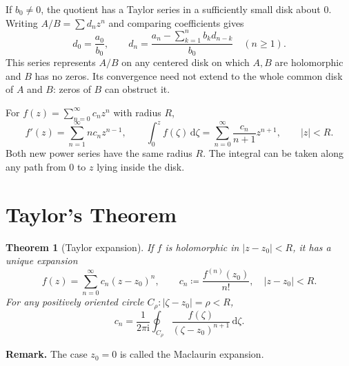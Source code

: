\documentclass[11pt,a4paper]{article}
\theoremstyle{definition}
\theoremstyle{plain}
\newtheorem{theorem}{Theorem}
\newcommand{\dd}{\,\mathrm{d}}
\begin{document}
If $b_0\neq0$, the quotient has a Taylor series in a sufficiently small
disk about $0$. Writing $A/B=\sum d_nz^n$ and comparing coefficients gives
\begin{equation}\label{eq:10}
d_0=\frac{a_0}{b_0},\qquad
 d_n=\frac{a_n-\sum_{k=1}^{n}b_kd_{n-k}}{b_0}\quad(n\geq1).
\end{equation}
This series represents $A/B$ on any centered disk on which $A,B$ are
holomorphic and $B$ has no zeros. Its convergence need not extend to the
whole common disk of $A$ and $B$: zeros of $B$ can obstruct it.

For $f(z)=\sum_{n=0}^{\infty}c_nz^n$ with radius $R$,
\begin{equation}\label{eq:11}
f'(z)=\sum_{n=1}^{\infty}n c_n z^{n-1},
 \qquad
 \int_0^z f(\zeta)\dd\zeta
    =\sum_{n=0}^{\infty}\frac{c_n}{n+1}z^{n+1},
 \qquad |z|<R.
\end{equation}
Both new power series have the same radius $R$. The integral can be taken
along any path from $0$ to $z$ lying inside the disk.

\section{Taylor's Theorem}
\begin{theorem}[Taylor expansion]
If $f$ is holomorphic in $|z-z_0|<R$, it has a unique expansion
\begin{equation}\label{eq:12}
\boxed{f(z)=\sum_{n=0}^{\infty}c_n(z-z_0)^n,\qquad
 c_n\coloneqq\frac{f^{(n)}(z_0)}{n!},\quad |z-z_0|<R.}
\end{equation}
For any positively oriented circle $C_\rho:|\zeta-z_0|=\rho<R$,
\begin{equation}\label{eq:13}
c_n=\frac1{2\pi \mathrm{i}}\oint_{C_\rho}
              \frac{f(\zeta)}{(\zeta-z_0)^{n+1}}\dd\zeta.
\end{equation}
\end{theorem}
\textbf{Remark.} The case $z_0=0$ is called the Maclaurin expansion.
\end{document}
